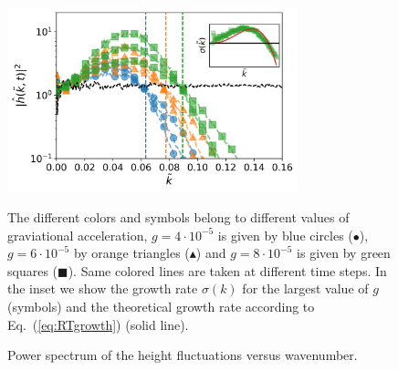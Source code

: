\begin{figure}
    \centering
    \includegraphics[width=0.75\textwidth]{graphics/Fig_3_new_RTI_spectra_single_color_same_tau_capkc_correct_rescaled_x_axis_inset.png}
    \caption{Power spectrum of the height fluctuations versus wavenumber.} The different colors and symbols belong to different values of graviational acceleration, $g=4\cdot 10^{-5}$ is given by blue circles (\textcolor{pyblue}{$\bullet$}), $g=6\cdot 10^{-5}$ by orange triangles (\textcolor{pyorange}{$\blacktriangle$}) and $g=8\cdot 10^{-5}$ is given by green squares (\textcolor{pygreen}{$\blacksquare$}). Same colored lines are taken at different time steps. In the inset we show the growth rate $\sigma(k)$ for the largest value of $g$ (symbols) and the theoretical growth rate according to Eq.~(\ref{eq:RTgrowth}) (solid line).
    \label{fig:RTI}
\end{figure}

